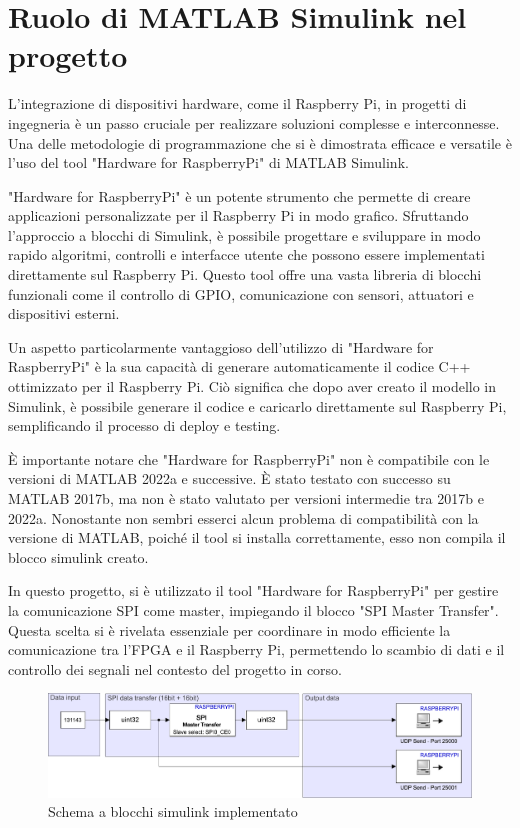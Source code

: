 \documentclass[titlepage]{report}
\begin{document}
	\section*{Ruolo di MATLAB Simulink nel progetto}
	\label{sec:ruolo_simulink}

		L'integrazione di dispositivi hardware, come il Raspberry Pi, in progetti di ingegneria è un passo cruciale per realizzare soluzioni complesse e interconnesse. Una delle metodologie di programmazione che si è dimostrata efficace e versatile è l'uso del tool "Hardware for RaspberryPi" di MATLAB Simulink.

		"Hardware for RaspberryPi" è un potente strumento che permette di creare applicazioni personalizzate per il Raspberry Pi in modo grafico. Sfruttando l'approccio a blocchi di Simulink, è possibile progettare e sviluppare in modo rapido algoritmi, controlli e interfacce utente che possono essere implementati direttamente sul Raspberry Pi. Questo tool offre una vasta libreria di blocchi funzionali come il controllo di GPIO, comunicazione con sensori, attuatori e dispositivi esterni. 
		
		Un aspetto particolarmente vantaggioso dell'utilizzo di "Hardware for RaspberryPi" è la sua capacità di generare automaticamente il codice C++ ottimizzato per il Raspberry Pi. Ciò significa che dopo aver creato il modello in Simulink, è possibile generare il codice e caricarlo direttamente sul Raspberry Pi, semplificando il processo di deploy e testing.
		
		È importante notare che "Hardware for RaspberryPi" non è compatibile con le versioni di MATLAB 2022a e successive. È stato testato con successo su MATLAB 2017b, ma non è stato valutato per versioni intermedie tra 2017b e 2022a. Nonostante non sembri esserci alcun problema di compatibilità con la versione di MATLAB, poiché il tool si installa correttamente, esso non compila il blocco simulink creato.

		In questo progetto, si è utilizzato il tool "Hardware for RaspberryPi" per gestire la comunicazione SPI come master, impiegando il blocco "SPI Master Transfer". Questa scelta si è rivelata essenziale per coordinare in modo efficiente la comunicazione tra l'FPGA e il Raspberry Pi, permettendo lo scambio di dati e il controllo dei segnali nel contesto del progetto in corso.

		\begin{figure}[ht]
			\centering
			\includegraphics[scale=0.6]{./img/test_raspi_psed_single.pdf}
			\caption{Schema a blocchi simulink implementato}
			\label{fig:simulink_sch}
		\end{figure}
\end{document}
